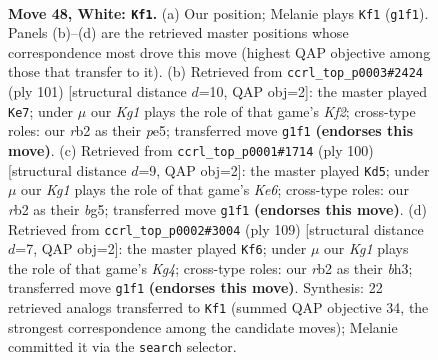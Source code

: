 \documentclass[11pt]{article}
\begin{document}
\clearpage

\begin{figure}[p]\centering
\begin{subfigure}{0.46\textwidth}\centering
\resizebox{\linewidth}{!}{%
\newchessgame
\chessboard[
  setfen={5k2/8/8/4p1p1/5p2/5B2/1r6/6K1 w - - 7 48},
  showmover=false,
  pgfstyle=straightmove, color=movearrow, markmove={g1-f1}
]}
\caption{}
\end{subfigure}\hfill
\begin{subfigure}{0.46\textwidth}\centering
\resizebox{\linewidth}{!}{%
\newchessgame
\chessboard[
  setfen={8/5k2/8/4P2P/5b2/1K3P2/6P1/8 b - - 2 51},
  showmover=false,
  pgfstyle=straightmove, color=movearrow, markmove={f7-e7}
]}
\caption{}
\end{subfigure}
\\[4pt]
\begin{subfigure}{0.46\textwidth}\centering
\resizebox{\linewidth}{!}{%
\newchessgame
\chessboard[
  setfen={8/7k/4K3/1p4b1/2pB4/8/8/8 w - - 6 51},
  showmover=false,
  pgfstyle=straightmove, color=movearrow, markmove={e6-d5}
]}
\caption{}
\end{subfigure}\hfill
\begin{subfigure}{0.46\textwidth}\centering
\resizebox{\linewidth}{!}{%
\newchessgame
\chessboard[
  setfen={8/8/1b1p4/1P1P2k1/2P5/5K1B/8/8 b - - 0 55},
  showmover=false,
  pgfstyle=straightmove, color=movearrow, markmove={g5-f6}
]}
\caption{}
\end{subfigure}
\caption{\textbf{Move 48, White: \texttt{Kf1}.} (a) Our position; Melanie plays \texttt{Kf1} (\texttt{g1f1}). Panels (b)--(d) are the retrieved master positions whose correspondence most drove this move (highest QAP objective among those that transfer to it). (b) Retrieved from \texttt{ccrl\_top\_p0003\#2424} (ply 101) [structural distance $d$=10, QAP obj=2]: the master played \texttt{Ke7}; under $\mu$ our \emph{Kg1} plays the role of that game's \emph{Kf2}; cross-type roles: our \emph{r}b2 as their \emph{p}e5; transferred move \texttt{g1f1} \textbf{(endorses this move)}. (c) Retrieved from \texttt{ccrl\_top\_p0001\#1714} (ply 100) [structural distance $d$=9, QAP obj=2]: the master played \texttt{Kd5}; under $\mu$ our \emph{Kg1} plays the role of that game's \emph{Ke6}; cross-type roles: our \emph{r}b2 as their \emph{b}g5; transferred move \texttt{g1f1} \textbf{(endorses this move)}. (d) Retrieved from \texttt{ccrl\_top\_p0002\#3004} (ply 109) [structural distance $d$=7, QAP obj=2]: the master played \texttt{Kf6}; under $\mu$ our \emph{Kg1} plays the role of that game's \emph{Kg4}; cross-type roles: our \emph{r}b2 as their \emph{b}h3; transferred move \texttt{g1f1} \textbf{(endorses this move)}. Synthesis: 22 retrieved analogs transferred to \texttt{Kf1} (summed QAP objective 34, the strongest correspondence among the candidate moves); Melanie committed it via the \texttt{search} selector.}
\label{fig:thought-m94}
\end{figure}
\end{document}
